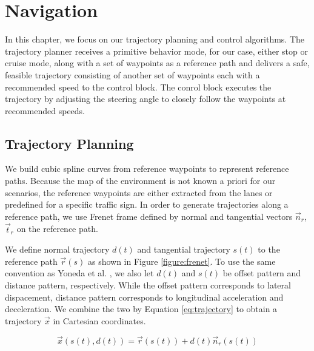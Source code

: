 \chapter{Navigation}
\label{chp:b5}

In this chapter, we focus on our trajectory planning and control algorithms.
The trajectory planner receives a primitive behavior mode, for our case, either
stop or cruise mode, along with a set of waypoints as a reference path and
delivers a safe, feasible trajectory consisting of another set of waypoints
each with a recommended speed to the control block. The conrol block executes
the trajectory by adjusting the steering angle to closely follow the waypoints
at recommended speeds.

\section{Trajectory Planning}

We build cubic spline curves from reference waypoints to represent reference
paths. Because the map of the environment is not known a priori for our
scenarios, the reference waypoints are either extracted from the lanes or
predefined for a specific traffic sign. In order to generate trajectories
along a reference path, we use Frenet frame \cite{Werling2010OptimalTG,
Yoneda2018TrajectoryOA} defined by normal and tangential vectors $\vec{n}_r$,
$\vec{t}_r$ on the reference path.

We define normal trajectory $d(t)$ and tangential trajectory $s(t)$ to the
reference path $\vec{r}(s)$ as shown in Figure \ref{figure:frenet}. To use the
same convention as Yoneda et al. \cite{Yoneda2018TrajectoryOA}, we also let
$d(t)$ and $s(t)$ be offset pattern and distance pattern, respectively. While
the offset pattern corresponds to lateral dispacement, distance pattern
corresponds to longitudinal acceleration and deceleration. We combine the two
by Equation \eqref{eq:trajectory} to obtain a trajectory $\vec{x}$ in Cartesian
coordinates.

\begin{equation}
  \vec{x}(s(t), d(t)) = \vec{r}(s(t)) + d(t)\vec{n}_r(s(t))
  \label{eq:trajectory}
\end{equation}


